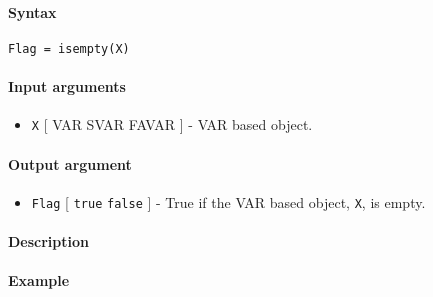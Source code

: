 


	\paragraph{Syntax}\label{syntax}

\begin{verbatim}
Flag = isempty(X)
\end{verbatim}

\paragraph{Input arguments}\label{input-arguments}

\begin{itemize}
\itemsep1pt\parskip0pt
\item
  \texttt{X} {[} VAR \textbar{} SVAR \textbar{} FAVAR {]} - VAR based
  object.
\end{itemize}

\paragraph{Output argument}\label{output-argument}

\begin{itemize}
\itemsep1pt\parskip0pt
\item
  \texttt{Flag} {[} \texttt{true} \textbar{} \texttt{false} {]} - True
  if the VAR based object, \texttt{X}, is empty.
\end{itemize}

\paragraph{Description}\label{description}

\paragraph{Example}\label{example}


